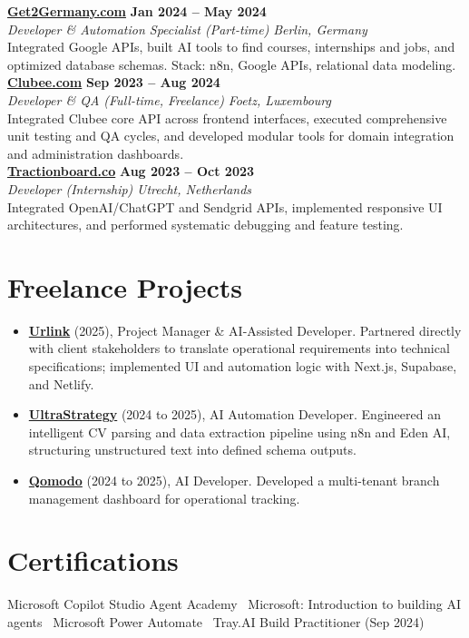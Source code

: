 \documentclass[a4paper,10pt]{article}
\newcommand{\role}[4]{%
  \textbf{#1} \hfill \textbf{#2}\\[1pt]%
  \textit{#3} \hfill \textit{#4}\\[2pt]%
}
\begin{document}
\role{\href{https://get2germany.com}{Get2Germany.com}}{Jan 2024 -- May 2024}{Developer \& Automation Specialist (Part-time)}{Berlin, Germany}
Integrated Google APIs, built AI tools to find courses, internships and jobs, and optimized database schemas. Stack: n8n, Google APIs, relational data modeling.\\[1pt]

\role{\href{https://clubee.com}{Clubee.com}}{Sep 2023 -- Aug 2024}{Developer \& QA (Full-time, Freelance)}{Foetz, Luxembourg}
Integrated Clubee core API across frontend interfaces, executed comprehensive unit testing and QA cycles, and developed modular tools for domain integration and administration dashboards.\\[1pt]

\role{\href{https://tractionboard.co}{Tractionboard.co}}{Aug 2023 -- Oct 2023}{Developer (Internship)}{Utrecht, Netherlands}
Integrated OpenAI/ChatGPT and Sendgrid APIs, implemented responsive UI architectures, and performed systematic debugging and feature testing.

\section{Freelance Projects}
\begin{itemize}
  \item \textbf{\href{https://smarturlink.com/}{Urlink}} (2025), Project Manager \& AI-Assisted Developer. Partnered directly with client stakeholders to translate operational requirements into technical specifications; implemented UI and automation logic with Next.js, Supabase, and Netlify.
  \item \textbf{\href{https://ultrastrategy.com}{UltraStrategy}} (2024 to 2025), AI Automation Developer. Engineered an intelligent CV parsing and data extraction pipeline using n8n and Eden AI, structuring unstructured text into defined schema outputs.
  \item \textbf{\href{https://www.qomodo.me/}{Qomodo}} (2024 to 2025), AI Developer. Developed a multi-tenant branch management dashboard for operational tracking.
\end{itemize}

\section{Certifications}
Microsoft Copilot Studio Agent Academy \textbullet\ Microsoft: Introduction to building AI agents \textbullet\ Microsoft Power Automate \textbullet\ Tray.AI Build Practitioner (Sep 2024)
\end{document}
